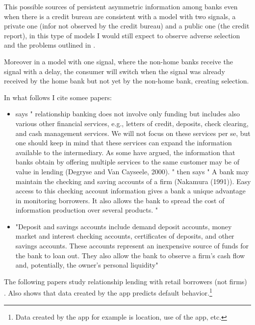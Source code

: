 \documentclass[12pt]{article}
\theoremstyle{plain}
\theoremstyle{plain}
\theoremstyle{definition}  %
\theoremstyle{remark}  %
\begin{document}
\begin{enumerate}
    This possible sources of persistent asymmetric information among banks even when there is a credit bureau are consistent with a model with two signals, a private one (infor not observed by the credit bureau) and a public one (the credit report), in this type of models I would still expect to observe adverse selection and the problems outlined in \textcite{sharpe_asymmetric_1990}.

    Moreover in a model with one signal, where the non-home banks receive the signal with a delay, the consumer will switch when the signal was already received by the home bank but not yet by the non-home bank, creating selection.

    In what follows I cite somee papers: 

    \begin{itemize}
        \item \textcite{boot_relationship_2000} says " relationship banking does not involve only funding but includes also various other financial services, e.g., letters of credit, deposits, check clearing, and cash management services. We will not focus on these services per se, but one should keep in mind that these services can expand the information available to the intermediary. As some have argued, the information that banks obtain by offering multiple services to the same customer may be of value in lending (Degryse and Van Cayseele, 2000). " then says " A bank may maintain the checking and saving accounts of a firm (Nakamura (1991)). Easy access to this checking account information gives a bank a unique advantage in monitoring borrowers. It also allows the bank to spread the cost of information production over several products. "

        \item \textcite{santikian_ties_2014} "Deposit and savings accounts include demand deposit accounts, money market and interest checking accounts, certificates of deposits, and other savings accounts. These accounts represent an inexpensive source of funds for the bank to loan out. They also allow the bank to observe a firm’s cash flow and, potentially, the owner’s personal liquidity"    
        
    \end{itemize}
    
    The following papers study relationship lending with retail borrowers (not firms) \textcite{agarwal_benefits_2018,puri_importance_2011,chakravarty_relationships_1999}. Also \textcite{lu_value_nodate} shows that data created by the app predicts default behavior.\footnote{Data created by the app for example is location, use of the app, etc.} 



\end{enumerate}
\end{document}
